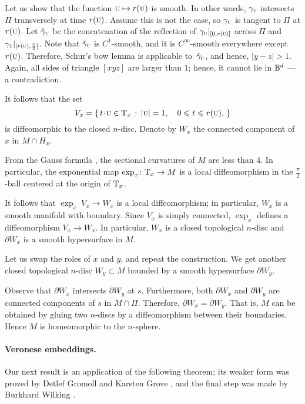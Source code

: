 \documentclass[a4paper,10pt]{article}
\begin{document}
Let us show that the function ${{\normalfont\textsc{u}}}\mapsto r({{\normalfont\textsc{u}}})$ is smooth.
In other words, $\gamma_{{\normalfont\textsc{u}}}$ intersects $\Pi$ transversely at time $r({{\normalfont\textsc{u}}})$.
Assume this is not the case, so $\gamma_{{\normalfont\textsc{u}}}$ is tangent to $\Pi$ at $r({{\normalfont\textsc{u}}})$.
Let $\hat\gamma_{{\normalfont\textsc{u}}}$ be the concatenation of the reflection of $\gamma_{{\normalfont\textsc{u}}}|_{[0,r({{\normalfont\textsc{u}}})]}$ across $\Pi$ and $\gamma_{{\normalfont\textsc{u}}}|_{[r({{\normalfont\textsc{u}}}),\frac\pi2]}$.
Note that $\hat \gamma_{{\normalfont\textsc{u}}}$ is $C^1$-smooth, and it is $C^\infty$-smooth everywhere except $r({{\normalfont\textsc{u}}})$.
Therefore, Schur's bow lemma is applicable to~$\hat \gamma_{{\normalfont\textsc{u}}}$, and hence, $|y-z|>1$.
Again, all sides of triangle $[xyz]$ are larger than $1$;
hence, it cannot lie in $\mathbb{B}^d$ --- a contradiction.  

It follows that the set 
\[V_x=\set{t\cdot {\mathsc{u}}\in \T_x}{|{\mathsc{u}}|=1,\quad 0\le t\le r({\mathsc{u}}),}\]
is diffeomorphic to the closed $n$-disc.
Denote by $W_x$ the connected component of $x$ in $M\cap H_x$.

From the Gauss formula \cite[Lemma 5]{petrunin2024}, the sectional curvatures of $M$ are less than $4$.
In particular, the exponential map $\exp_x\colon\mathrm{T}_x\to M$ is a local diffeomorphism in the $\tfrac\pi2$-ball centered at the origin of $\mathrm{T}_x$.

It follows that $\exp_x\:V_x\to W_x$ is a local diffeomorphism;
in particular, $W_x$ is a smooth manifold with boundary.
Since $V_x$ is simply connected, $\exp_x$ defines a diffeomorphism $V_x\to W_x$.
In particular, $W_x$ is a closed topological $n$-disc and $\partial W_x$ is a smooth hypersurface in $M$.

Let us swap the roles of $x$ and $y$, and repeat the construction.
We get another closed topological $n$-disc $W_y\subset M$ bounded by a smooth hypersurface $\partial W_y$.

Observe that $\partial W_x$ intersects $\partial W_y$ at $s$.
Furthermore, both $\partial W_x$ and $\partial W_y$ are connected components of $s$ in $M\cap \Pi$.
Therefore, $\partial W_x=\partial W_y$.
That is, $M$ can be obtained by gluing two $n$-discs by a diffeomorphism between their boundaries.
Hence $M$ is homeomorphic to the $n$-sphere.
\qeds

\paragraph{Veronese embeddings.}\label{thm:=}
Our next result is an application of the following theorem;
its weaker form was proved by Detlef Gromoll and Karsten Grove \cite{gromoll-grove}, and
the final step was made by Burkhard Wilking \cite{wilking}.
\end{document}
